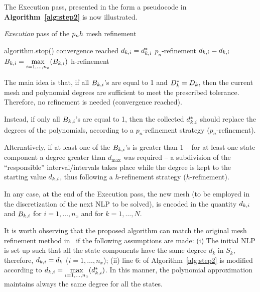 The Execution pass, presented in the form a pseudocode in {\bf Algorithm~\ref{alg:step2}} is now illustrated.
\begin{algorithm}
	\caption{\emph{Execution} pass of the $p_{n}h$ mesh refinement}\label{alg:step2}
	\begin{algorithmic}[1]
			\If {$\Dks = \Dk$}
				\State algorithm.stop() \Comment convergence reached	
			\Else
					\State $d_{k,i} = d_{k,i}^{*}$ \Comment ${p_n}$-refinement
				\EndFor
			\EndIf
		\Else
				\State $d_{k,i} = d_{k,i}$
				\State $B_{k,i} = \max\limits_{i= 1, \dots, n_x}(B_{k,i})$ \Comment h-refinement
			\EndFor		
		\EndIf
	\end{algorithmic}
\end{algorithm}
The main idea is that, if all $B_{k,i}$'s are equal to 1 and $\Dks = \Dk$, then the current mesh and polynomial degrees are sufficient to meet the prescribed tolerance. Therefore, no refinement is needed (convergence reached).

 Instead, if only all $B_{k,i}$'s are equal to 1, then the collected $d_{k,i}^{*}$ should replace the degrees of the polynomials, according to a $p_n$-refinement strategy (${p_n}$-refinement).

Alternatively, if at least one of the $B_{k,i}$'s is greater than 1 -- for at least one state component a degree greater than $d_{\max}$ was required -- a subdivision of the ``responsible'' interval/intervals takes place while the degree is kept to the starting value $d_{k,i}$, thus following a $h$-refinement strategy ($h$-refinement).

In any case, at the end of the Execution pass, the new mesh (to be employed in the discretization of the next NLP to be solved), is encoded in the quantity $d_{k,i}$ and $B_{k,i}$ for $i = 1, \dots, n_x$ and for $k = 1, \dots, N$.


It is worth observing that the proposed algorithm can match the original mesh refinement method in~\cite{Patterson:OCAM:2015} if the following assumptions are made: (i) The initial NLP is set up such that all the state components have the same degree $d_k$ in $S_k$, therefore, $d_{k,i} = d_k$ ($i = 1, \dots, n_x$); (ii) line 6: of Algorithm~\ref{alg:step2} is modified according to $d_{k,i} = \max\limits_{i= 1, \dots, n_x}(d_{k,i}^{*})$. In this manner, the polynomial approximation maintains always the same degree for all the states.




